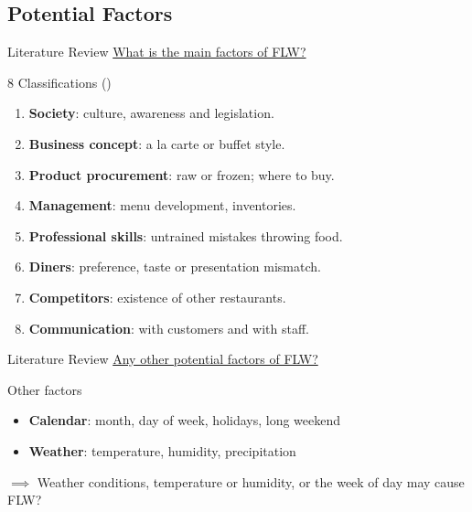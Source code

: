 \documentclass{beamer}\usepackage[]{graphicx}\usepackage[]{xcolor}
\begin{document}
\subsection{Potential Factors}
\begin{frame}{Literature Review}
    \underline{What is the main factors of FLW?}
    \begin{block}{8 Classifications (\cite{Heikkila2016-el})}
        \begin{enumerate}
            \item \textbf{Society}: \small culture, awareness and legislation.
            \item \textbf{Business concept}: \small a la carte or buffet style.
            \item \textbf{Product procurement}: \small raw or frozen; where to buy.
            \item \textbf{Management}: \small menu development, inventories.
            \item \textbf{Professional skills}: \small untrained mistakes throwing food.
            \item \textbf{Diners}: \small preference, taste or presentation mismatch.
            \item \textbf{Competitors}: \small existence of other restaurants.
            \item \textbf{Communication}: \small with customers and with staff.
        \end{enumerate}
    \end{block}    
\end{frame}

\begin{frame}{Literature Review}
    \underline{Any other potential factors of FLW?}
    \begin{block}{Other factors}
        \begin{itemize}
            \item \textbf{Calendar}: month, day of week, holidays, long weekend
            \item \textbf{Weather}: temperature, humidity, precipitation
        \end{itemize}       
    \end{block}
    $\implies$ Weather conditions, temperature or humidity, or the week of day may cause FLW?
\end{frame}
\end{document}
